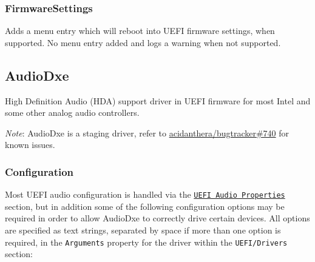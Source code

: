\documentclass[]{article}
\begin{document}
\subsubsection{FirmwareSettings}\label{firmwaresettings}

Adds a menu entry which will reboot into UEFI firmware settings, when supported.
No menu entry added and logs a warning when not supported.

\subsection{AudioDxe}\label{uefiaudio}

High Definition Audio (HDA) support driver in UEFI firmware for most Intel and some other analog audio controllers.

\emph{Note}: AudioDxe is a staging driver, refer to \href{https://github.com/acidanthera/bugtracker/issues/740}{acidanthera/bugtracker\#740}
for known issues.

\subsubsection{Configuration}

Most UEFI audio configuration is handled via the \hyperref[uefiaudioprops]{\texttt{UEFI Audio Properties}}
section, but in addition some of the following configuration options may be required in order
to allow AudioDxe to correctly drive certain devices. All options are specified as text strings,
separated by space if more than one option is required, in the \texttt{Arguments} property for
the driver within the \texttt{UEFI/Drivers} section:
\end{document}
